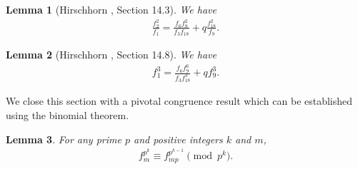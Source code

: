 \documentclass[a4paper,12pt,reqno]{amsart}
\newtheorem{lemma}{Lemma}[section]
\numberwithin{equation}{section}
\begin{document}
\begin{lemma}[Hirschhorn \cite{r5}, Section 14.3]\label{l3}
	We have
	\begin{align*}
		\frac{f_{2}^{2}}{f_{1}}	= \frac{f_{6} f_{9}^{2}}{f_{3} f_{18}}+q\frac{f_{18}^{2}}{f_{9}}.
	\end{align*}
	\end{lemma}
		\begin{lemma}[Hirschhorn \cite{r5}, Section 14.8]\label{l4}
			We have
			\begin{align*}
		f_1^3 =\frac{f_6f_9^6}{f_3f_{18}^3}+qf_9^3.
		\end{align*}
\end{lemma}

\noindent 
We close this section with a pivotal congruence result which can be established using the binomial theorem.
\begin{lemma}\label{bt}
For any prime $p$ and positive integers $k$ and $m$,
	\begin{align*}
	f_m^{p^k} \equiv f_{mp}^{p^{k-1}} \pmod{p^k}.
\end{align*}
\end{lemma}
\end{document}
